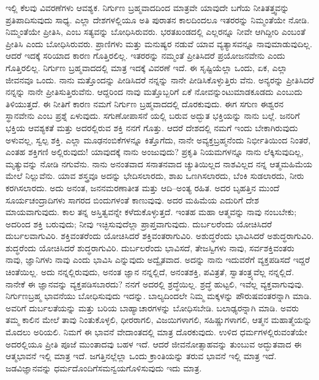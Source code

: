 ಇಲ್ಲಿ ಕೆಲವು ವಿವರಣೆಗಳು ಆವಶ್ಯಕ. ನಿರ್ಗುಣ ಬ್ರಹ್ಮವಾದದಿಂದ ಮಾತ್ರವೇ ಯಾವುದೇ ಬಗೆಯ ನೀತಿತತ್ತ್ವವನ್ನು ಪ್ರತಿಪಾದಿಸುವುದು ಸಾಧ್ಯ. ಎಲ್ಲಾ ದೇಶಗಳಲ್ಲಿಯೂ ಅತಿ ಪುರಾತನ ಕಾಲದಿಂದಲೂ ಇತರರನ್ನು ನಿಮ್ಮಂತೆಯೇ ನೋಡಿ. ನಿಮ್ಮಂತೆಯೇ ಪ್ರೀತಿಸಿ, ಎಂಬ ಸತ್ಯವನ್ನು ಬೋಧಿಸಿರುವರು. ಭರತಖಂಡದಲ್ಲಿ ಎಲ್ಲರನ್ನೂ ನೀವೇ ಆಗಿದ್ದೀರಿ ಎಂಬಂತೆ ಪ್ರೀತಿಸಿ ಎಂದು ಬೋಧಿಸಿರುವರು. ಪ್ರಾಣಿಗಳು ಮತ್ತು ಮನುಷ್ಯರ ನಡುವೆ ಯಾವ ವ್ಯತ್ಯಾಸವನ್ನೂ ನಾವುಮಾಡುವುದಿಲ್ಲ. ಆದರೆ ಇದಕ್ಕೆ ಸರಿಯಾದ ಕಾರಣ ಗೊತ್ತಿರಲಿಲ್ಲ. ಇತರರನ್ನು ನಮ್ಮಂತೆ ಪ್ರೀತಿಸಿದರೆ ಪ್ರಯೋಜನವೇನು ಎಂದು ಗೊತ್ತಿರಲಿಲ್ಲ. ನಿರ್ಗುಣ ಬ್ರಹ್ಮವಾದದಲ್ಲಿ ಮಾತ್ರ ಇದಕ್ಕೆ ವಿವರಣೆ ಇದೆ. ಈ ಸೃಷ್ಟಿಯೆಲ್ಲಾ ಒಂದು, ಏಕ, ಎಲ್ಲಾ ಜೀವನವೂ ಒಂದು. ನಾನು ಮತ್ತೊಂದನ್ನು ಪೀಡಿಸಿದರೆ ನನ್ನನ್ನು ನಾನೇ ಪೀಡಿಸಿಕೊಳ್ಳುತ್ತಿರು ವೆನು. ಅನ್ಯರನ್ನು ಪ್ರೀತಿಸಿದರೆ ನನ್ನನ್ನು ನಾನೇ ಪ್ರೀತಿಸುತ್ತಿರುವೆನು. ಆದ್ದರಿಂದ ನಾವು ಮತ್ತೊಬ್ಬರಿಗೆ ಏಕೆ ನೋವನ್ನುಂಟುಮಾಡಕೂಡದು ಎಂಬುದು ತಿಳಿಯುತ್ತದೆ. ಈ ನೀತಿಗೆ ಕಾರಣ ನಮಗೆ ನಿರ್ಗುಣ ಬ್ರಹ್ಮವಾದದಲ್ಲಿ ದೊರಕುವುದು. ಈಗ ಸಗುಣ ಈಶ್ವರನ ಸ್ಥಾನವೇನು ಎಂಬ ಪ್ರಶ್ನೆ ಏಳುವುದು. ಸಗುಣೋಪಾಸನೆ ಯಲ್ಲಿ ಬರುವ ಅದ್ಭುತ ಭಕ್ತಿಯನ್ನು ನಾನು ಬಲ್ಲೆ. ಜನರಿಗೆ ಭಕ್ತಿಯ ಆವಶ್ಯಕತೆ ಮತ್ತು ಅದರಲ್ಲಿರುವ ಶಕ್ತಿ ನನಗೆ ಗೊತ್ತು. ಆದರೆ ದೇಶದಲ್ಲಿ ನಮಗೆ ಇಂದು ಬೇಕಾಗಿರುವುದು ಅಳುವಲ್ಲ, ಸ್ವಲ್ಪ ಶಕ್ತಿ. ಎಲ್ಲಾ ಮೂಢನಂಬಿಕೆಗಳನ್ನೂ ಕಿತ್ತೊಗೆದು, ನಾನೇ ಅವ್ಯಕ್ತಬ್ರಹ್ಮನೆಂದು ನಿರ್ಭೀತಿಯಿಂದ ನಿಂತರೆ, ಎಂತಹ ಶಕ್ತಿಗಣಿ ಅಲ್ಲಿರುವುದು! ಯಾವುದಕ್ಕೆ ನಾನು ಅಂಜುವುದು? ಪ್ರಕೃತಿ ನಿಯಮಗಳನ್ನೂ ನಾನು ಲೆಕ್ಕಿಸುವುದಿಲ್ಲ, ಮೃತ್ಯುವನ್ನು ನೋಡಿ ನಗುವೆನು. ನಾನು ಅನಂತವಾದ ಸನಾತನವಾದ ಚ್ಯುತಿಯಿಲ್ಲದ ನಾಶವಿಲ್ಲದ ನನ್ನ ಆತ್ಮಮಹಿಮೆಯ ಮೇಲೆ ನಿಲ್ಲುವೆನು. ಯಾವ ಶಸ್ತ್ರವೂ ಅದನ್ನು ಭೇದಿಸಲಾರದು, ಶಾಖ ಒಣಗಿಸಲಾರದು, ಬೆಂಕಿ ಸುಡಲಾರದು, ನೀರು ಕರಗಿಸಲಾರದು. ಅದು ಅನಂತ, ಜನನಮರಣಾತೀತ ಮತ್ತು ಆದಿ–ಅಂತ್ಯ ರಹಿತ. ಅದರ ಬೃಹತ್ತಿನ ಮುಂದೆ ಸೂರ್ಯಚಂದ್ರಾದಿಗಳು ಸಾಗರದ ಬಿಂದುಗಳಂತೆ ಕಾಣುವುವು. ಅದರ ಮಹಿಮೆಯ ಎದುರಿಗೆ ದೇಶ ಮಾಯವಾಗುವುದು. ಕಾಲ ತನ್ನ ಅಸ್ತಿತ್ವವನ್ನೇ ಕಳೆದುಕೊಳ್ಳುತ್ತದೆ. ಇಂತಹ ಮಹಾ ಆತ್ಮವನ್ನು ನಾವು ನಂಬಬೇಕು; ಅದರಿಂದ ಶಕ್ತಿ ಬರುವುದು; ನೀವು ಇಚ್ಛಿಸುವುದೆಲ್ಲಾ ಪ್ರಾಪ್ತವಾಗುವುದು. ದುರ್ಬಲರೆಂದು ಯೋಚಿಸಿದರೆ ದುರ್ಬಲವಾಗುವಿರಿ. ಶಕ್ತಿವಂತರೆಂದು ಯೋಚಿಸಿದರೆ ಶಕ್ತಿವಂತರಾಗುವಿರಿ. ಅಶುದ್ಧರೆಂದು ಭಾವಿಸಿದರೆ ಅಶುದ್ಧರಾಗುವಿರಿ. ಶುದ್ಧರೆಂದು ಯೋಚಿಸಿದರೆ ಶುದ್ಧರಾಗುವಿರಿ. ದುರ್ಬಲರೆಂದು ಭಾವಿಸದೆ, ತೇಜಸ್ವಿಗಳು ನಾವು, ಸರ್ವಶಕ್ತಿವಂತರು ನಾವು, ಜ್ಞಾನಿಗಳು ನಾವು ಎಂದು ಭಾವಿಸಿ ಎನ್ನುವುದು ಅದ್ವೈತ\-ವಾದ. ಅದನ್ನು ನಾನು ಇದುವರೆಗೆ ವ್ಯಕ್ತಪಡಿಸದೆ ಇದ್ದರೆ ಚಿಂತೆಯಿಲ್ಲ. ಅದು ನನ್ನಲ್ಲಿರುವುದು, ಅನಂತ ಜ್ಞಾನ ನನ್ನಲ್ಲಿದೆ, ಅನಂತಶಕ್ತಿ, ಪವಿತ್ರತೆ, ಸ್ವಾತಂತ್ರ್ಯವೆಲ್ಲ ನನ್ನಲ್ಲಿದೆ. ನಾನೇಕೆ ಈ ಜ್ಞಾನವನ್ನು ವ್ಯಕ್ತಪಡಿಸಬಾರದು? ನನಗೆ ಅದರಲ್ಲಿ ಶ್ರದ್ಧೆಯಿಲ್ಲ. ಶ್ರದ್ಧೆ ಹುಟ್ಟಲಿ, ಇವೆಲ್ಲ ವ್ಯಕ್ತವಾಗುವುವು. ನಿರ್ಗುಣಬ್ರಹ್ಮ ಭಾವನೆಯು ಬೋಧಿಸುವುದು ಇದನ್ನು. ಬಾಲ್ಯದಿಂದಲೇ ನಿಮ್ಮ ಮಕ್ಕಳನ್ನು ಪೌರುಷವಂತ\-ರನ್ನಾಗಿ ಮಾಡಿ. ಅವರಿಗೆ ದುರ್ಬಲತೆಯನ್ನು ಮತ್ತು ಬರಿಯ ಬಾಹ್ಯಾಚಾರಗಳನ್ನು ಬೋಧಿಸಬೇಡಿ. ಬಲಾಢ್ಯರನ್ನಾಗಿ ಮಾಡಿ. ಅವರು ತಮ್ಮ ಕಾಲಿನ ಮೇಲೆ ತಾವು ನಿಂತುಕೊಳ್ಳಲಿ, ಧೀರರಾಗಲಿ, ವಿಜಯಿಗಳಾಗಲಿ, ಸಹಿಷ್ಣುಗಳಾಗಲಿ, ಆತ್ಮನ ಮಹಾತ್ಮೆಯನ್ನು ಮೊದಲು ಅರಿಯಲಿ. ನಿಮಗೆ ಈ ಭಾವನೆ ವೇದಾಂತದಲ್ಲಿ ಮಾತ್ರ ದೊರಕುವುದು. ಉಳಿದ ಧರ್ಮಗಳಲ್ಲಿರುವಂತೆಯೇ ಅದರಲ್ಲಿಯೂ ಪ್ರೀತಿ ಪೂಜೆ ಮುಂತಾದವು ಬಹಳ ಇದೆ. ಆದರೆ ಜೀವನೋತ್ಸಾಹವನ್ನು ತುಂಬುವ ಅದ್ಭುತವಾದ ಈ ಆತ್ಮಭಾವನೆ ಇಲ್ಲಿ ಮಾತ್ರ ಇದೆ. ಜಗತ್ತಿನಲ್ಲೆಲ್ಲಾ ಒಂದು ಕ್ರಾಂತಿಯನ್ನು ತರುವ ಭಾವನೆ ಇಲ್ಲಿ ಮಾತ್ರ ಇದೆ. ಜಡವಿಜ್ಞಾನವನ್ನು ಧರ್ಮದೊಂದಿಗೆ\break ಸಮನ್ವಯಗೊಳಿಸುವುದು ಇದು ಮಾತ್ರ. 

